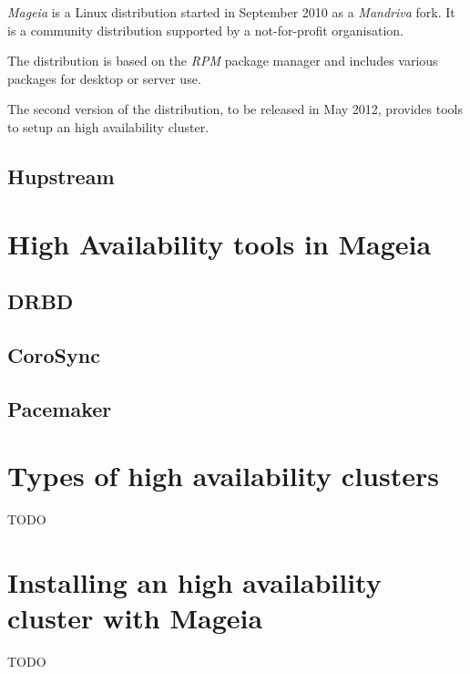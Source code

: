 \documentclass[a4paper,12pt]{article}
\begin{document}
\emph{Mageia} is a Linux distribution started in September 2010 as a
\emph{Mandriva} fork. It is a community distribution supported by a
not-for-profit organisation.

The distribution is based on the \emph{RPM} package manager and includes
various packages for desktop or server use.

The second version of the distribution, to be released in May 2012,
provides tools to setup an high availability cluster.


\subsection{Hupstream}

\cleardoublepage
\section{High Availability tools in Mageia}
\subsection{DRBD}
\subsection{CoroSync}
\subsection{Pacemaker}

\cleardoublepage
\section{Types of high availability clusters}
TODO

\cleardoublepage
\section{Installing an high availability cluster with Mageia}
TODO

\cleardoublepage
\end{document}
